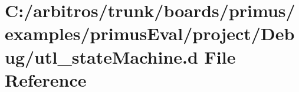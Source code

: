 \hypertarget{boards_2primus_2examples_2primus_eval_2project_2_debug_2utl__state_machine_8d}{\section{C\-:/arbitros/trunk/boards/primus/examples/primus\-Eval/project/\-Debug/utl\-\_\-state\-Machine.d File Reference}
\label{boards_2primus_2examples_2primus_eval_2project_2_debug_2utl__state_machine_8d}
}
